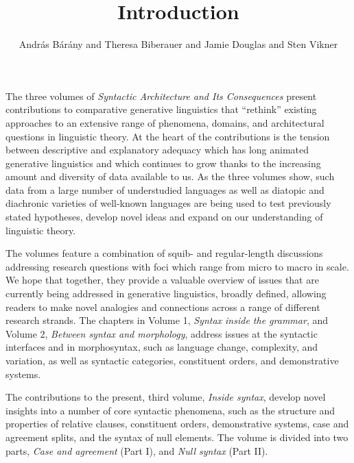 \documentclass[output=paper]{langsci/langscibook}
\author{András Bárány\affiliation{Bielefeld University} and
        Theresa Biberauer\affiliation{University of Cambridge, Stellenbosch
        University \& University of the West Cape} and
        Jamie Douglas\affiliation{University of Cambridge} and
        Sten Vikner\affiliation{Aarhus University}}
\title{Introduction}
\begin{document}
\maketitle

\noindent The three volumes of \emph{Syntactic Architecture and Its
Consequences} present contributions to comparative generative linguistics that
\enquote{rethink} existing approaches to an extensive range of phenomena,
domains, and architectural questions in linguistic theory. At the heart of the
contributions is the tension between descriptive and explanatory adequacy which
has long animated generative linguistics and which continues to grow thanks to
the increasing amount and diversity of data available to us. As the three
volumes show, such data from a large number of understudied languages as well
as diatopic and diachronic varieties of well-known languages are being used to
test previously stated hypotheses, develop novel ideas and expand on our
understanding of linguistic theory.

The volumes feature a combination of squib- and regular-length discussions
addressing research questions with foci which range from micro to macro in
scale. We hope that together, they provide a valuable overview of issues that
are currently being addressed in generative linguistics, broadly defined,
allowing readers to make novel analogies and connections across a range of
different research strands. The chapters in Volume 1, \emph{Syntax inside the
grammar}, and Volume 2, \emph{Between syntax and morphology}, address issues at
the syntactic interfaces and in morphosyntax, such as language change,
complexity, and variation, as well as syntactic categories, constituent orders,
and demonstrative systems.

The contributions to the present, third volume, \emph{Inside syntax}, develop
novel insights into a number of core syntactic phenomena, such as the structure
and properties of relative clauses, constituent orders, demonstrative systems,
case and agreement splits, and the syntax of null elements. The volume is
divided into two parts, \emph{Case and agreement} (Part I), and \emph{Null
syntax} (Part II).
\end{document}
